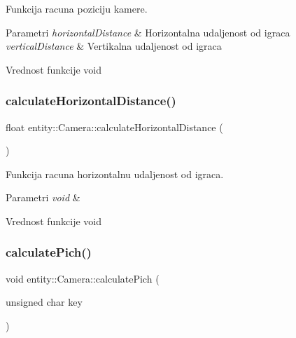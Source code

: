 Funkcija racuna poziciju kamere. 


\begin{DoxyParams}{Parametri}
{\em horizontal\+Distance} & Horizontalna udaljenost od igraca \\
\hline
{\em vertical\+Distance} & Vertikalna udaljenost od igraca \\
\hline
\end{DoxyParams}
\begin{DoxyReturn}{Vrednost funkcije}
void 
\end{DoxyReturn}
\mbox{\label{classentity_1_1Camera_ad5ed7dcbe9aa939d82509c23a6298251}} 
\subsubsection{\texorpdfstring{calculate\+Horizontal\+Distance()}{calculateHorizontalDistance()}}
{\footnotesize\ttfamily float entity\+::\+Camera\+::calculate\+Horizontal\+Distance (\begin{DoxyParamCaption}{ }\end{DoxyParamCaption})\hspace{0.3cm}{\ttfamily [private]}}



Funkcija racuna horizontalnu udaljenost od igraca. 


\begin{DoxyParams}{Parametri}
{\em void} & \\
\hline
\end{DoxyParams}
\begin{DoxyReturn}{Vrednost funkcije}
void 
\end{DoxyReturn}
\mbox{\label{classentity_1_1Camera_a65a338e64af13f3da99b46fbf5cf879a}} 
\subsubsection{\texorpdfstring{calculate\+Pich()}{calculatePich()}}
{\footnotesize\ttfamily void entity\+::\+Camera\+::calculate\+Pich (\begin{DoxyParamCaption}\item[{unsigned char}]{key }\end{DoxyParamCaption})\hspace{0.3cm}{\ttfamily [private]}}



